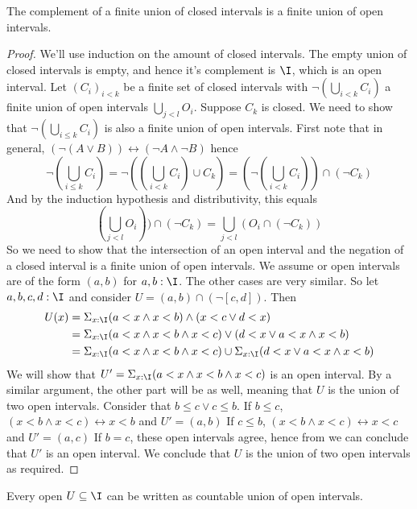 \begin{lemma}\label{complementClosedIntervalOpenIntervals}
  The complement of a finite union of closed intervals is 
  a finite union of open intervals. 
\end{lemma}
\begin{proof}
  We'll use induction on the amount of closed intervals. 
  The empty union of closed intervals is empty, and hence it's complement is $\I$, which is an open interval.  
  Let $(C_i)_{i<k}$ be a finite set of closed intervals with $\neg (\bigcup_{i<k}C_i)$ 
  a finite union of open intervals $\bigcup_{j<l} O_i$. 
  Suppose $C_{k}$ is closed. We need to show that 
  $\neg (\bigcup_{i\leq k} C_i)$ is also a finite union of open intervals. 
  First note that in general, 
  $(\neg (A \vee B ))\leftrightarrow (\neg A \wedge \neg B)$
  hence 
  $$
  \neg (\bigcup_{i\leq k} C_i)
  = 
  \neg ((\bigcup_{i<k} C_i) \cup C_k) 
  =
  (\neg (\bigcup_{i<k} C_i) )\cap (\neg C_k) 
  $$
  And by the induction hypothesis and distributivity, this equals 
  $$
  (\bigcup_{j<l} O_i) ) \cap (\neg C_k) 
  =
  \bigcup_{j<l} (O_i \cap (\neg C_k) )
  $$
  So we need to show that the intersection of an open interval and the negation of a closed interval is a 
  finite union of open intervals. We assume or open intervals are of the form $(a,b)$ for $a,b:\I$. 
  The other cases are very similar. 
  So let $a,b,c,d:\I$ and consider 
  $U = (a,b) \cap (\neg [c,d])$. 
  Then 
  \begin{align} 
    U(x) &= \Sigma_{x:\I}  
  (a < x \wedge x < b) \wedge ( x < c \vee d < x)\\
  &= \Sigma_{x:\I}
  (a < x \wedge x < b \wedge x < c ) \vee ( d < x \vee a<x \wedge x < b)\\
  &= 
  \Sigma_{x:\I}
  (a < x \wedge x < b \wedge x < c ) 
  \cup 
  \Sigma_{x:\I}
  ( d < x \vee a<x \wedge x < b)
  \end{align} 
  We will show that 
  $U' = \Sigma_{x:\I}(a < x \wedge x < b \wedge x < c ) $ is an open interval. 
  By a similar argument, the other part will be as well, meaning that $U$ is the union of two open intervals. 
  Consider that $b\leq c \vee c \leq b$. 
  If $b \leq c$, $(x<b \wedge x< c) \leftrightarrow x<b$ and $U' = (a,b)$
  If $c \leq b$, $(x<b \wedge x< c) \leftrightarrow x<c$ and $U' = (a,c)$
  If $b=c$, these open intervals agree, hence from  we can conclude that $U'$ is an open interval. 
  We conclude that $U$ is the union of two open intervals as required. 
\end{proof}
%
\begin{lemma}
  Every open $U\subseteq \I$ can be written as countable union of open intervals.
\end{lemma} 
